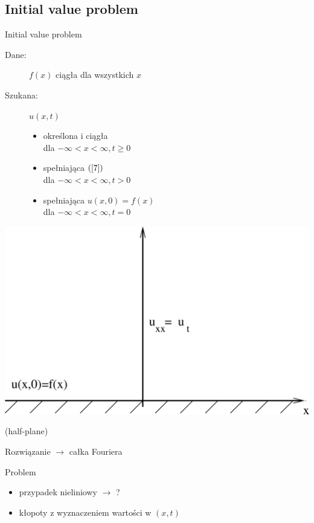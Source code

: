 \subsection{Initial value problem}

\begin{frame}{Initial value problem}
  \begin{description}
    \item[Dane:]
      $f(x)$ ciągła dla wszystkich $x$
    \item[Szukana:]
      $u(x,t)$
      \begin{itemize}
        \item określona i ciągła \\ dla $-\infty < x < \infty, t \ge 0$
        \item spełniająca $(\ref{7})$ \\ dla $-\infty < x < \infty, t > 0$
        \item spełniająca $u(x,0) = f(x)$ \\ dla $-\infty < x < \infty, t = 0$
      \end{itemize}
  \end{description}
\end{frame}

\begin{frame}
  \centerline{\includegraphics[height = 0.85 \textheight]{img/23/ivp}}
  (half-plane)
\end{frame}

\begin{frame}
  Rozwiązanie $\rightarrow$ całka Fouriera
  \begin{alertblock}{Problem}
    \begin{itemize}
      \item przypadek nieliniowy $\rightarrow$ ?
      \item kłopoty z wyznaczeniem wartości w $(x,t)$
    \end{itemize}
  \end{alertblock}
\end{frame}
